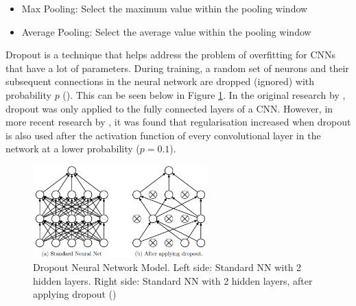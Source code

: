 \begin{itemize}
    \item Max Pooling: Select the maximum value within the pooling window
    \item Average Pooling: Select the average value within the pooling window
\end{itemize}

Dropout is a technique that helps address the problem of overfitting for \acrshort{CNN}s that have a lot of parameters. During training, a random set of neurons and their subsequent connections in the neural network are dropped (ignored) with probability $p$ (\cite{srivastava_dropout_2014}). This can be seen below in Figure \ref{fig:cnn_dropout}. In the original research by \cite{hinton_dropout_2012}, dropout was only applied to the fully connected layers of a \acrshort{CNN}. However, in more recent research by \cite{lai_dropout_2017}, it was found that regularisation increased when dropout is also used after the activation function of every convolutional layer in the network at a lower probability ($p = 0.1$).

\begin{figure}[ht!]
\centering
\includegraphics[width=0.6\textwidth]{media/literature/machine_learning/ml_dropout.png}
\caption[Diagram of the Dropout Neural Network Model]{Dropout Neural Network Model. Left side: Standard \acrshort{NN} with 2 hidden layers. Right side: Standard \acrshort{NN} with 2 hidden layers, after applying dropout (\cite{srivastava_dropout_2014})}
\label{fig:cnn_dropout}
\end{figure}




%    


